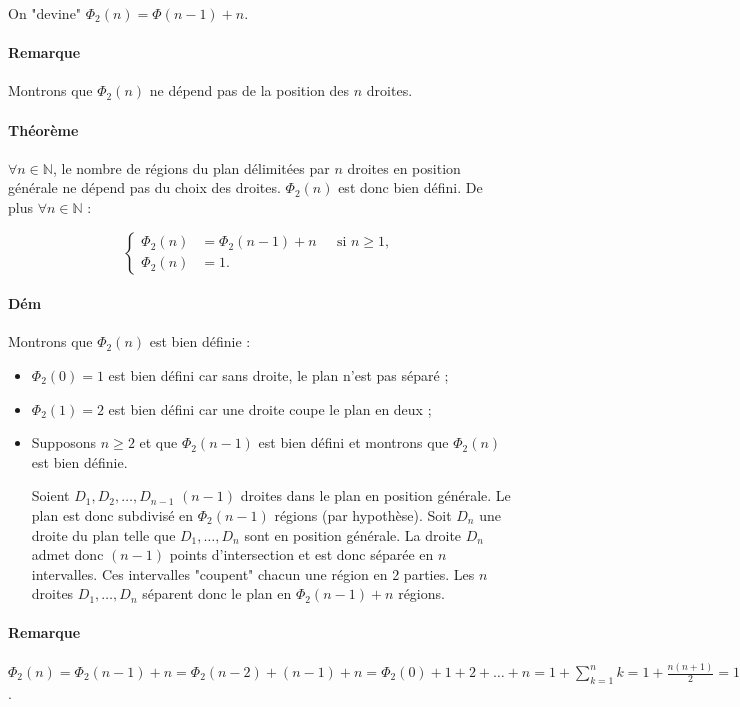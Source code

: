 \documentclass{article}
\begin{document}
			On "devine" $\Phi_2(n) = \Phi(n-1) + n$.

			\paragraph{Remarque} Montrons que $\Phi_2(n)$ ne dépend pas de la position des $n$ droites.

			\paragraph{Théorème} $\forall n \in \mathbb N$, le nombre de régions du plan délimitées par $n$ droites en position générale ne dépend pas du choix des droites.
			$\Phi_2(n)$ est donc bien défini. De plus $\forall n \in \mathbb N$ :

			\[\left\{\begin{aligned}
				\Phi_2(n) &= \Phi_2(n-1)+n \;\;\;\;\text{ si $n \geq 1$}, \\
				\Phi_2(n) &= 1.
			\end{aligned}\right.\]

			\paragraph{Dém} Montrons que $\Phi_2(n)$ est bien définie :

			\begin{itemize}
				\item $\Phi_2(0) = 1$ est bien défini car sans droite, le plan n'est pas séparé ;
				\item $\Phi_2(1) = 2$ est bien défini car une droite coupe le plan en deux ;
				\item Supposons $n \geq 2$ et que $\Phi_2(n-1)$ est bien défini et montrons que $\Phi_2(n)$ est bien définie.

					  Soient $D_1, D_2, \ldots, D_{n-1}$ $(n-1)$ droites dans le plan en position générale. Le plan est donc subdivisé en $\Phi_2(n-1)$ régions (par hypothèse).
					  Soit $D_n$ une droite du plan telle que $D_1, \ldots, D_n$ sont en position générale. La droite $D_n$ admet donc $(n-1)$ points d'intersection
					  et est donc séparée en $n$ intervalles. Ces intervalles "coupent" chacun une région en 2 parties. Les $n$ droites $D_1, \ldots, D_n$ séparent
					  donc le plan en $\Phi_2(n-1) + n$ régions.
			\end{itemize}

			\paragraph{Remarque} $\Phi_2(n) = \Phi_2(n-1) + n = \Phi_2(n-2) + (n-1) + n = \Phi_2(0) + 1 + 2 + \ldots + n = 1 + \sum_{k=1}^nk = 1 + \frac {n(n+1)}2 =
			1 +\binom {n+1}2 = 1 + \binom n1 + \binom n2 = \sum_{k=0}^2\binom nk$.
\end{document}
